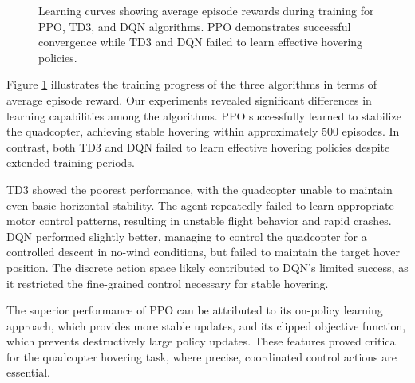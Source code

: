 \documentclass[12pt]{article}
\begin{document}
\begin{figure}[htbp]
\centering
\caption{Learning curves showing average episode rewards during training for PPO, TD3, and DQN algorithms. PPO demonstrates successful convergence while TD3 and DQN failed to learn effective hovering policies.}
\label{fig:learning_curves}
\end{figure}


Figure \ref{fig:learning_curves} illustrates the training progress of the three algorithms in terms of average episode reward. Our experiments revealed significant differences in learning capabilities among the algorithms. PPO successfully learned to stabilize the quadcopter, achieving stable hovering within approximately 500 episodes. In contrast, both TD3 and DQN failed to learn effective hovering policies despite extended training periods.


TD3 showed the poorest performance, with the quadcopter unable to maintain even basic horizontal stability. The agent repeatedly failed to learn appropriate motor control patterns, resulting in unstable flight behavior and rapid crashes. DQN performed slightly better, managing to control the quadcopter for a controlled descent in no-wind conditions, but failed to maintain the target hover position. The discrete action space likely contributed to DQN's limited success, as it restricted the fine-grained control necessary for stable hovering.


The superior performance of PPO can be attributed to its on-policy learning approach, which provides more stable updates, and its clipped objective function, which prevents destructively large policy updates. These features proved critical for the quadcopter hovering task, where precise, coordinated control actions are essential.
\end{document}
